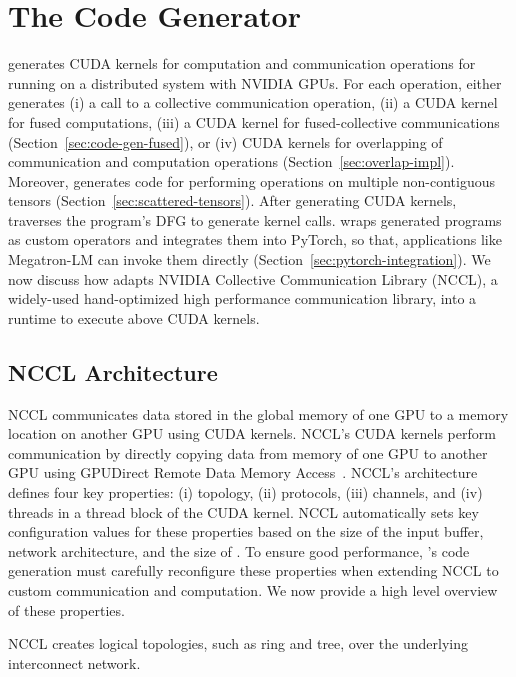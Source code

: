 \section{The \tool Code Generator}
\label{sec:runtime}
\tool generates CUDA kernels for computation and communication operations for running on a distributed system with NVIDIA GPUs.
For each operation, \tool either generates (i) a call to a collective communication operation, 
(ii) a CUDA kernel for fused computations,
(iii) a CUDA kernel for fused-collective communications (Section~\ref{sec:code-gen-fused}), or
(iv) CUDA kernels for overlapping of communication and computation operations (Section~\ref{sec:overlap-impl}).
Moreover, \tool generates code for performing operations on multiple non-contiguous 
tensors (Section~\ref{sec:scattered-tensors}).
After generating CUDA kernels, \tool traverses the program's DFG to generate kernel calls.
\tool wraps generated programs as custom operators and integrates them into PyTorch, so that, applications like Megatron-LM can invoke them directly (Section~\ref{sec:pytorch-integration}).
We now discuss how \tool adapts NVIDIA Collective Communication Library (NCCL), a widely-used
hand-optimized high performance communication library, into a runtime
to execute above CUDA kernels. 

\subsection{NCCL Architecture}
\label{sec:nccl-arch}
NCCL communicates data stored in the global memory of one GPU to a memory location on another GPU using CUDA kernels.
NCCL's CUDA kernels perform communication by directly copying data from memory of one GPU to another GPU using GPUDirect Remote Data Memory Access~\cite{gpudirect}.
NCCL's architecture defines four key properties: (i) topology, (ii)
protocols, (iii) channels, and (iv) threads in a thread block of the
CUDA kernel. NCCL automatically sets key configuration values for these properties
based on the size of the input buffer, network architecture, and the size of
\WORLD. To ensure good performance, \tool's code generation must carefully reconfigure these properties
when extending NCCL to custom communication and computation.
We now provide a high level overview of these properties.

 NCCL creates logical topologies, such as ring and tree, over the underlying interconnect network. 

